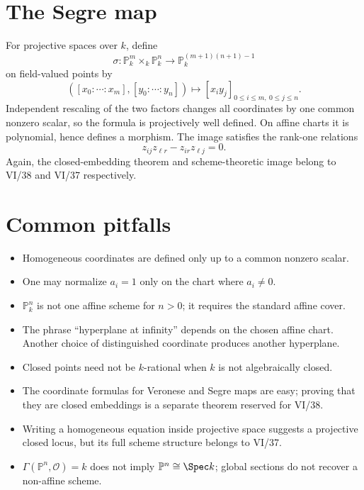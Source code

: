 

\section{The Segre map}
For projective spaces over \(k\), define
\[
\sigma:\mathbb P^m_k\times_k\mathbb P^n_k
\longrightarrow\mathbb P^{(m+1)(n+1)-1}_k
\]
on field-valued points by
\[
([x_0:\cdots:x_m],[y_0:\cdots:y_n])
\longmapsto [x_i y_j]_{0\le i\le m,\ 0\le j\le n}.
\]
Independent rescaling of the two factors changes all coordinates by one common nonzero scalar, so the formula is projectively well defined.  On affine charts it is polynomial, hence defines a morphism.  The image satisfies the rank-one relations
\[
z_{ij}z_{\ell r}-z_{ir}z_{\ell j}=0.
\]
Again, the closed-embedding theorem and scheme-theoretic image belong to VI/38 and VI/37 respectively.

\section{Common pitfalls}
\begin{itemize}
\item Homogeneous coordinates are defined only up to a common nonzero scalar.
\item One may normalize \(a_i=1\) only on the chart where \(a_i\ne0\).
\item \(\mathbb P^n_k\) is not one affine scheme for \(n>0\); it requires the standard affine cover.
\item The phrase ``hyperplane at infinity'' depends on the chosen affine chart.  Another choice of distinguished coordinate produces another hyperplane.
\item Closed points need not be \(k\)-rational when \(k\) is not algebraically closed.
\item The coordinate formulas for Veronese and Segre maps are easy; proving that they are closed embeddings is a separate theorem reserved for VI/38.
\item Writing a homogeneous equation inside projective space suggests a projective closed locus, but its full scheme structure belongs to VI/37.
\item \(\Gamma(\mathbb P^n,\mathcal O)=k\) does not imply \(\mathbb P^n\cong\Spec k\); global sections do not recover a non-affine scheme.
\end{itemize}

